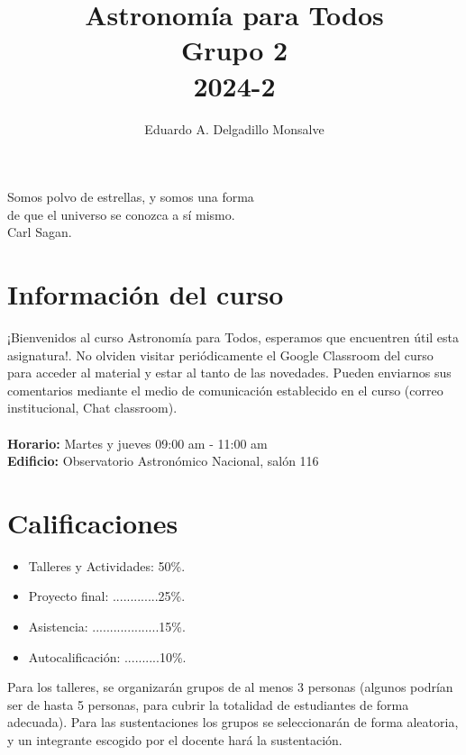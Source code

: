 \documentclass[12pt]{article}
\title{\textbf{Astronomía para Todos}\\ \small Grupo 2\\ 2024-2}
\author[1]{\raggedright Eduardo A. Delgadillo Monsalve}
\affil[1]{\raggedright\small MSc estudiante - Astronomía (eadelgadillom@unal.edu.co) \newline \small Observatorio Astronómico Nacional, Universidad Nacional de Colombia}
\date{}
\begin{document}
\maketitle
\begin{flushright}
    Somos polvo de estrellas, y somos una forma\\ de que el universo se conozca a sí mismo.\\ Carl Sagan.
\end{flushright}

\section*{Información del curso}
¡Bienvenidos al curso Astronomía para Todos, esperamos que encuentren útil esta asignatura!. No olviden visitar periódicamente el Google Classroom del curso para acceder al material y estar al tanto de las novedades. Pueden enviarnos sus comentarios mediante el medio de comunicación establecido en el curso (correo institucional, Chat classroom).\\
\\
\textbf{Horario:} Martes y jueves 09:00 am - 11:00 am\\
\textbf{Edificio:} Observatorio Astronómico Nacional, salón 116

\section*{Calificaciones}
\begin{itemize}
    \item Talleres y Actividades: 50\%.
    \item Proyecto final: .............25\%.
    \item Asistencia: ...................15\%.
    \item Autocalificación: ..........10\%.
\end{itemize}

Para los talleres, se organizarán grupos de al menos 3 personas (algunos podrían ser de hasta 5 personas, para cubrir la totalidad de estudiantes de forma adecuada). Para las sustentaciones los grupos se seleccionarán de forma aleatoria, y un integrante escogido por el docente hará la sustentación.
\end{document}
